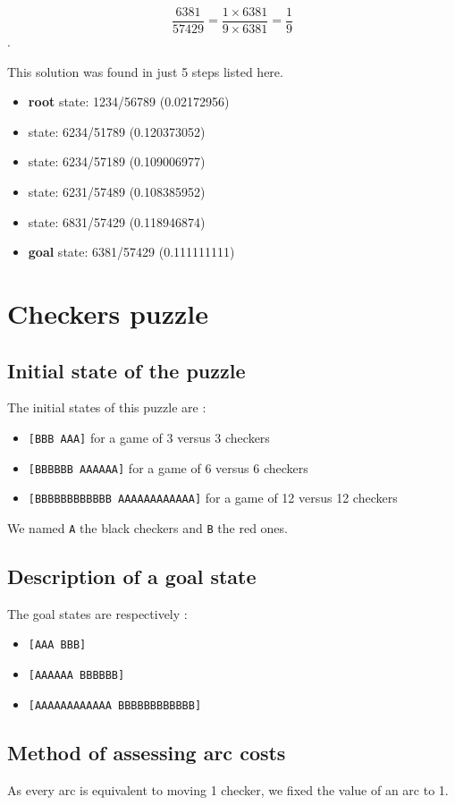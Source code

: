 \documentclass{article}
\begin{document}
\[\frac{6381}{57429} = \frac{1 \times 6381}{9 \times 6381} = \frac{1}{9}\].

This solution was found in just 5 steps listed here.

\begin{itemize}
  \item \textbf{root} state: 1234/56789 (0.02172956) 
  \item state: 6234/51789 (0.120373052)
  \item state: 6234/57189 (0.109006977)
  \item state: 6231/57489 (0.108385952)
  \item state: 6831/57429 (0.118946874)
  \item \textbf{goal} state: 6381/57429 (0.111111111)
\end{itemize}


\section{Checkers puzzle}

\subsection{Initial state of the puzzle}
The initial states of this puzzle are :
\begin{itemize}
  \item \texttt{[BBB AAA]} for a game of 3 versus 3 checkers
  \item \texttt{[BBBBBB AAAAAA]} for a game of 6 versus 6 checkers
  \item \texttt{[BBBBBBBBBBBB AAAAAAAAAAAA]} for a game of 12 versus 12 checkers
\end{itemize}

We named \texttt{A} the black checkers and \texttt{B} the red ones.

\subsection{Description of a goal state}
The goal states are respectively :
\begin{itemize}
  \item \texttt{[AAA BBB]}
  \item \texttt{[AAAAAA BBBBBB]}
  \item \texttt{[AAAAAAAAAAAA BBBBBBBBBBBB]}
\end{itemize}

\subsection{Method of assessing arc costs}
As every arc is equivalent to moving 1 checker, we fixed the value of an arc to
1.
\end{document}
